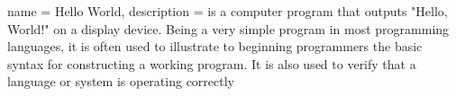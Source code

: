 {
    name = Hello World,
    description = {is a computer program that outputs "Hello, World!" on a display device. Being a very simple program in most programming languages, it is often used to illustrate to beginning programmers the basic syntax for constructing a working program. It is also used to verify that a language or system is operating correctly} 
}
